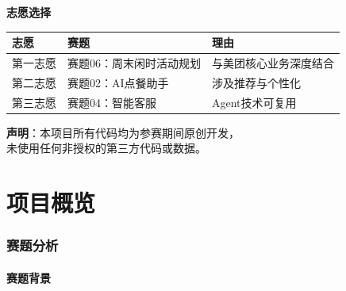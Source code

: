 \documentclass[12pt,a4paper]{ctexart}
\begin{document}
\vspace{1.5cm}

\begin{center}
{\Large\bfseries 志愿选择}
\end{center}

\vspace{0.5cm}

\begin{table}[H]
\centering
\renewcommand{\arraystretch}{1.4}
\begin{tabular}{p{2cm} p{5cm} p{5cm}}
\toprule
\textbf{志愿} & \textbf{赛题} & \textbf{理由} \\
\midrule
第一志愿 & 赛题06：周末闲时活动规划 & 与美团核心业务深度结合 \\
第二志愿 & 赛题02：AI点餐助手 & 涉及推荐与个性化 \\
第三志愿 & 赛题04：智能客服 & Agent技术可复用 \\
\bottomrule
\end{tabular}
\end{table}

\vfill

\begin{center}
\begin{tcolorbox}[colback=infobg, colframe=accent, width=10cm, arc=3pt]
\centering
\textbf{声明}：本项目所有代码均为参赛期间原创开发，\\
未使用任何非授权的第三方代码或数据。
\end{tcolorbox}
\end{center}

\newpage

\setcounter{tocdepth}{3}
\tableofcontents
\newpage
\listoftables
\lstlistoflistings
\newpage


\part{项目概览}

\section{赛题分析}

\subsection{赛题背景}
\end{document}
